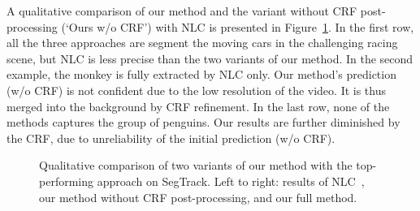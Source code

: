 A qualitative comparison of our method and the variant without CRF
post-processing (`Ours w/o CRF') with NLC is presented in
Figure~\ref{fig:segtrack}. In the first row, all the three approaches are
segment the moving cars in the challenging racing scene, but NLC is less
precise than the two variants of our method. In the second example, the monkey is fully extracted by NLC only. Our method's prediction (w/o CRF) is
not confident due to the low resolution of the video. It is thus
merged into the background by CRF refinement. In the
last row, none of the methods captures the group of penguins. Our results are
further diminished by the CRF, due to unreliability of the initial prediction
(w/o CRF).
\begin{figure}[t]
\begin{center}
\vspace{0.1cm}
\vspace{0.1cm}
\end{center}
\vspace{-0.3cm}\caption{Qualitative comparison of two variants of our method
with the top-performing approach on SegTrack. Left to right: results of
NLC~\cite{Faktor14}, our method without CRF post-processing, and our full
method.}
\label{fig:segtrack}
\end{figure}

